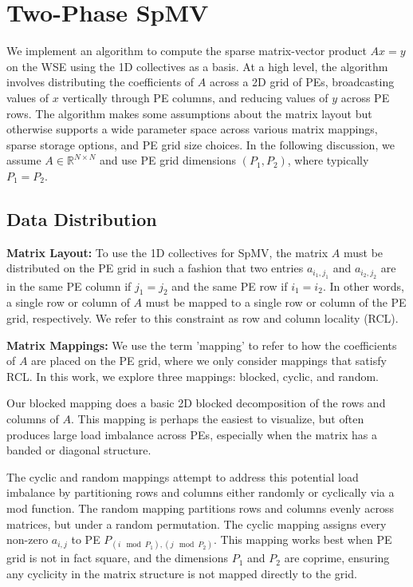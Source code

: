 \documentclass[conference]{IEEEtran}
\begin{document}
\section{Two-Phase SpMV}
We implement an algorithm to compute the sparse matrix-vector product  $Ax = y$ on the WSE using the 1D collectives as a basis.
At a high level, the algorithm involves distributing the coefficients of $A$ across a 2D grid of PEs, broadcasting values of $x$ vertically through PE columns, and reducing values of $y$ across PE rows. The algorithm makes some assumptions about the matrix layout but otherwise supports a wide parameter space across various matrix mappings, sparse storage options, and PE grid size choices. In the following discussion, we assume $A \in \mathbb{R}^{N \times N}$ and use PE grid dimensions $(P_1, P_2)$, where typically $P_1 = P_2$.

\subsection{Data Distribution}
\label{sec:mapping}

\textbf{Matrix Layout:}
To use the 1D collectives for SpMV, the matrix $A$ must be distributed on the PE grid in such a fashion that two entries $a_{i_1,j_1}$ and $a_{i_2,j_2}$ are in the same PE column if $j_1 = j_2$ and the same PE row if $i_1 = i_2$. In other words, a single row or column of $A$ must be mapped to a single row or column of the PE grid, respectively. We refer to this constraint as row and column locality (RCL).

\textbf{Matrix Mappings:}
We use the term 'mapping' to refer to how the coefficients of $A$ are placed on the PE grid, where we only consider mappings that satisfy RCL. In this work, we explore three mappings: blocked, cyclic, and random.

Our blocked mapping does a basic 2D blocked decomposition of the rows and columns of $A$. This mapping is perhaps the easiest to visualize, but often produces large load imbalance across PEs, especially when the matrix has a banded or diagonal structure.

The cyclic and random mappings attempt to address this potential load imbalance by partitioning rows and columns either randomly or cyclically via a mod function. The random mapping partitions rows and columns evenly across matrices, but under a random permutation. The cyclic mapping assigns every non-zero $a_{i,j}$ to PE $P_{(i \mod P_1),(j \mod P_2)}$. This mapping works best when PE grid is not in fact square, and the dimensions $P_1$ and $P_2$ are coprime, ensuring any cyclicity in the matrix structure is not mapped directly to the grid.
\end{document}
